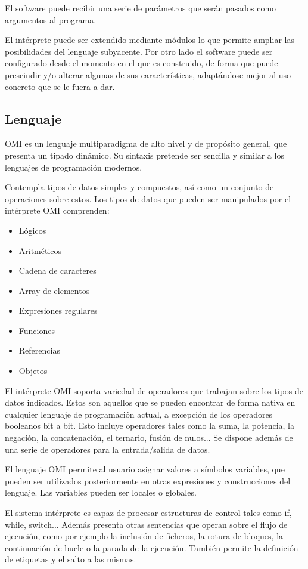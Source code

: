 El software puede recibir una serie de parámetros que serán pasados como argumentos al programa.  

El intérprete puede ser extendido mediante módulos lo que permite ampliar las posibilidades del lenguaje subyacente. Por otro lado el software 
puede ser configurado desde el momento en el que es construido, de forma que puede prescindir y/o alterar algunas de sus características, adaptándose mejor 
al uso concreto que se le fuera a dar. 

\subsection{Lenguaje} 
OMI es un lenguaje multiparadigma de alto nivel y de propósito general, que presenta un tipado dinámico. Su sintaxis pretende 
ser sencilla y similar a los lenguajes de programación modernos. 

Contempla tipos de datos simples y compuestos, así como un conjunto de operaciones sobre estos. Los tipos de datos que pueden ser 
manipulados por el intérprete OMI comprenden:

\begin{itemize}
  \item Lógicos
  \item Aritméticos
  \item Cadena de caracteres
  \item Array de elementos
  \item Expresiones regulares
  \item Funciones
  \item Referencias
  \item Objetos
\end{itemize}

El intérprete OMI soporta variedad de operadores que trabajan sobre los tipos de datos indicados. Estos son aquellos que se pueden encontrar de forma
nativa en cualquier lenguaje de programación actual, a excepción de los operadores booleanos bit a bit. Esto incluye operadores tales como 
la suma, la potencia, la negación, la concatenación, el ternario, fusión de nulos... Se dispone además de una serie de operadores para la entrada/salida de datos. 

El lenguaje OMI permite al usuario asignar valores a símbolos variables, que pueden ser utilizados posteriormente en otras expresiones y construcciones del lenguaje. Las 
variables pueden ser locales o globales.

El sistema intérprete es capaz de procesar estructuras de control tales como if, while, switch... Además presenta otras sentencias que operan sobre el flujo de ejecución, 
como por ejemplo la inclusión de ficheros, la rotura de bloques, la continuación de bucle o la parada de la ejecución. También permite la definición de etiquetas y el salto a las mismas.

